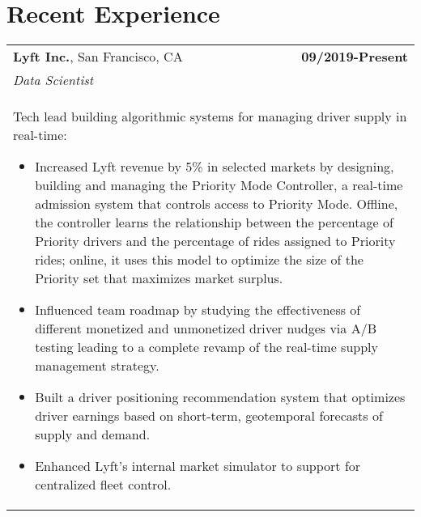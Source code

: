 \documentclass[a4paper,10pt]{article}
\begin{document}
\section{Recent Experience}
\begin{tabularx}{\textwidth}{Xr}

 {\bf{Lyft Inc.}}, San Francisco, CA & \bf{09/2019-Present}\\
 \emph{Data Scientist} &\\
 \multicolumn{2}{p{0.98\textwidth}}{
 Tech lead building algorithmic systems for managing driver supply in real-time:
 \begin{itemize}
 	\item Increased Lyft revenue by 5\% in selected markets by designing, building and managing the Priority Mode Controller, a real-time admission system that controls access to Priority Mode. Offline, the controller learns the relationship between the percentage of Priority drivers and the percentage of rides assigned to Priority rides; online, it uses this model to optimize the size of the Priority set that maximizes market surplus.
 	\item Influenced team roadmap by studying the effectiveness of different monetized and unmonetized driver nudges via A/B testing leading to a complete revamp of the real-time supply management strategy.
 	\item Built a driver positioning recommendation system that optimizes driver earnings based on short-term, geotemporal forecasts of supply and demand.
 	\item Enhanced Lyft's internal market simulator to support for centralized fleet control.
 \end{itemize}
 }\\


\end{tabularx}
\end{document}
